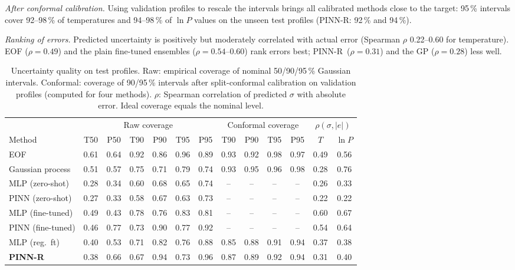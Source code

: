 \documentclass[11pt,a4paper]{article}
\newcommand{\ours}{PINN-R}
\begin{document}
\emph{After conformal calibration.} Using validation profiles to rescale the intervals brings all calibrated methods close to the target: 95\,\% intervals cover 92--98\,\% of temperatures and 94--98\,\% of $\ln P$ values on the unseen test profiles (\ours: 92\,\% and 94\,\%).

\emph{Ranking of errors.} Predicted uncertainty is positively but moderately correlated with actual error (Spearman $\rho$ 0.22--0.60 for temperature). EOF ($\rho=0.49$) and the plain fine-tuned ensembles ($\rho=0.54$--0.60) rank errors best; \ours\ ($\rho=0.31$) and the GP ($\rho=0.28$) less well.

\begin{table}[t]
\centering\small
\caption{Uncertainty quality on test profiles. Raw: empirical coverage of nominal 50/90/95\,\% Gaussian intervals. Conformal: coverage of 90/95\,\% intervals after split-conformal calibration on validation profiles (computed for four methods). $\rho$: Spearman correlation of predicted $\sigma$ with absolute error. Ideal coverage equals the nominal level.}\label{tab:uq}
\setlength{\tabcolsep}{3.5pt}
\begin{tabular}{l*{6}{c}*{4}{c}cc}
\toprule
& \multicolumn{6}{c}{Raw coverage} & \multicolumn{4}{c}{Conformal coverage} & \multicolumn{2}{c}{$\rho(\sigma,|e|)$}\\
\cmidrule(lr){2-7}\cmidrule(lr){8-11}\cmidrule(l){12-13}
Method & T50 & P50 & T90 & P90 & T95 & P95 & T90 & P90 & T95 & P95 & $T$ & $\ln P$\\
\midrule
EOF & 0.61 & 0.64 & 0.92 & 0.86 & 0.96 & 0.89 & 0.93 & 0.92 & 0.98 & 0.97 & 0.49 & 0.56\\
Gaussian process & 0.51 & 0.57 & 0.75 & 0.71 & 0.79 & 0.74 & 0.93 & 0.95 & 0.96 & 0.98 & 0.28 & 0.76\\
MLP (zero-shot) & 0.28 & 0.34 & 0.60 & 0.68 & 0.65 & 0.74 & -- & -- & -- & -- & 0.26 & 0.33\\
PINN (zero-shot) & 0.27 & 0.33 & 0.58 & 0.67 & 0.63 & 0.73 & -- & -- & -- & -- & 0.22 & 0.22\\
MLP (fine-tuned) & 0.49 & 0.43 & 0.78 & 0.76 & 0.83 & 0.81 & -- & -- & -- & -- & 0.60 & 0.67\\
PINN (fine-tuned) & 0.46 & 0.77 & 0.73 & 0.90 & 0.77 & 0.92 & -- & -- & -- & -- & 0.54 & 0.64\\
MLP (reg.\ ft) & 0.40 & 0.53 & 0.71 & 0.82 & 0.76 & 0.88 & 0.85 & 0.88 & 0.91 & 0.94 & 0.37 & 0.38\\
\textbf{\ours} & 0.38 & 0.66 & 0.67 & 0.94 & 0.73 & 0.96 & 0.87 & 0.89 & 0.92 & 0.94 & 0.31 & 0.40\\
\bottomrule
\end{tabular}
\end{table}
\end{document}
